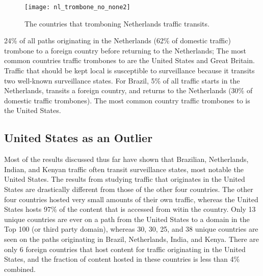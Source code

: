 \begin{figure}
\centering
\texttt{[image: nl\_trombone\_no\_none2]}
\caption{The countries that tromboning Netherlands traffic transits.}
\label{fig:trombone_netherlands}
\end{figure}

24\% of all paths originating in the Netherlands (62\% of domestic traffic) trombone to a foreign country before returning to the Netherlands; The most common countries traffic trombones to are the United States and Great Britain.  Traffic that should be kept local is susceptible to surveillance because it transits two well-known surveillance states.  For Brazil, 5\% of all traffic starts in the Netherlands, transits a foreign country, and returns to the Netherlands (30\% of domestic traffic trombones).  The most common country traffic trombones to is the United States. 

\subsection{United States as an Outlier}

Most of the results discussed thus far have shown that Brazilian, Netherlands, Indian, and Kenyan traffic often transit surveillance states, most notable the United States.  The results from studying traffic that originates in the United States are drastically different from those of the other four countries.  The other four countries hosted very small amounts of their own traffic, whereas the United States hosts 97\% of the content that is accessed from witin the country.  Only 13 unique countries are ever on a path from the United States to a domain in the Top 100 (or third party domain), whereas 30, 30, 25, and 38 unique countries are seen on the paths originating in Brazil, Netherlands, India, and Kenya.  There are only 6 foreign countries that host content for traffic originating in the United States, and the fraction of content hosted in these countries is less than 4\% combined.
